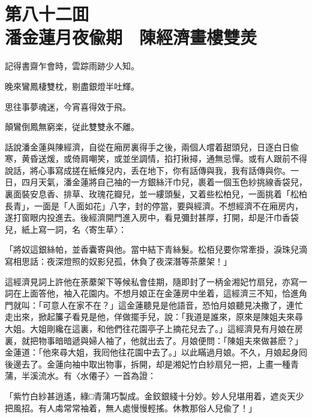 
\chapter*{第八十二囬　\\潘金蓮月夜偸期　陳經濟畫樓雙羙}


\begin{myquote}
記得書齋乍會時，雲踪雨跡少人知。

晚來鸞鳳棲雙枕，剔盡銀燈半吐輝。

思往事夢魂迷，今宵喜得效于飛。

顛鸞倒鳳無窮楽，従此雙雙永不離。
\end{myquote}

話說潘金蓮與陳經濟，自從在廂房裏得手之後，兩個人嚐着甜頭兒，日逐白日偸寒，黄昏送煖，或倚肩嘲笑，或並坐調情，掐打揪撏，通無忌憚。或有人跟前不得說話，將心事寫成搓在紙條兒内，丢在地下，你有話傳與我，我有話傳與你。一日，四月天氣，潘金蓮將自己袖的一方銀絲汗巾兒，裹着一個玉色紗挑線香袋兒，裏面裝安息香、排草、玫瑰花瓣兒，並一縷頭髮，又着些松柏兒，一面挑着「松柏長青」，一面是「人面如花」八字，封的停當，要與經濟。不想經濟不在廂房内，遂打窗眼内投進去。後經濟開門進入房中，看見彌封甚厚，打開，却是汗巾香袋兒，紙上寫一詞，名〈寄生草〉：

\begin{myquote}
「將奴這銀絲帕，並香囊寄與他。當中結下青絲髮。松栢兒要你常牽掛，淚珠兒滴寫相思話：夜深燈照的奴影兒孤，休負了夜深潛等茶䕷架！」
\end{myquote}

這經濟見詞上許他在荼䕷架下等候私會佳期，隨即封了一柄金湘妃竹扇兒，亦寫一詞在上面答他，袖入花園内。不想月娘正在金蓮房中坐着，這經濟三不知，恰進角門就叫：「可意人在家不在？」這金蓮聽見是他語音，恐怕月娘聽見决撒了，連忙走出來，掀起簾子看見是他，佯做擺手兒，說：「我道是誰來，原來是陳姐夫來尋大姐。大姐剛纔在這裏，和他們往花園亭子上摘花兒去了。」這經濟見有月娘在房裏，就把物事暗暗遞與婦人袖了，他就出去了。月娘便問：「陳姐夫來做甚麽？」金蓮道：「他來尋大姐，我囘他往花園中去了。」以此瞞過月娘。不久，月娘起身囘後邊去了。金蓮向袖中取出物事，拆開，却是湘妃竹白紗扇兒一把，上畫一種青蒲，半溪流水。有〈水僊子〉一首為證：

\begin{myquote}
「紫竹白紗甚逍遙，綠□青蒲巧製成。金鉸銀綫十分妙。妙人兒堪用着，遮炎天少把風招。有人䖏常常袖着，無人處慢慢輕搖。休教那俗人兒偸了！」
\end{myquote}

